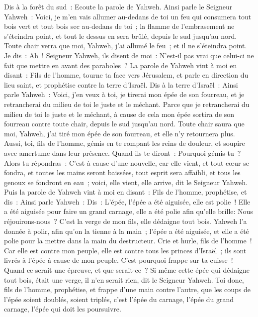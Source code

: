 \begin{multicols}{2}
Dis à la forêt du sud~: Ecoute la parole de Yahweh. Ainsi parle le Seigneur Yahweh~: Voici, je m'en vais allumer au-dedans de toi un feu qui consumera tout bois vert et tout bois sec au-dedans de toi~; la flamme de l'embrasement ne s'éteindra point, et tout le dessus en sera brûlé, depuis le sud jusqu'au nord.
Toute chair verra que moi, Yahweh, j'ai allumé le feu~; et il ne s'éteindra point.
Je dis~: Ah~! Seigneur Yahweh, ils disent de moi~: N'est-il pas vrai que celui-ci ne fait que mettre en avant des paraboles~?
La parole de Yahweh vint à moi en disant~:
Fils de l'homme, tourne ta face vers Jérusalem, et parle en direction du lieu saint, et prophétise contre la terre d'Israël.
Dis à la terre d'Israël~: Ainsi parle Yahweh~: Voici, j'en veux à toi, je tirerai mon épée de son fourreau, et je retrancherai du milieu de toi le juste et le méchant.
Parce que je retrancherai du milieu de toi le juste et le méchant, à cause de cela mon épée sortira de son fourreau contre toute chair, depuis le sud jusqu'au nord.
Toute chair saura que moi, Yahweh, j'ai tiré mon épée de son fourreau, et elle n'y retournera plus.
Aussi, toi, fils de l'homme, gémis en te rompant les reins de douleur, et soupire avec amertume dans leur présence.
Quand ils te diront~: Pourquoi gémis-tu~? Alors tu répondras~: C'est à cause d'une nouvelle, car elle vient, et tout cœur se fondra, et toutes les mains seront baissées, tout esprit sera affaibli, et tous les genoux se fondront en eau~; voici, elle vient, elle arrive, dit le Seigneur Yahweh.
Puis la parole de Yahweh vint à moi en disant~:
Fils de l'homme, prophétise, et dis~: Ainsi parle Yahweh~: Dis~: L'épée, l'épée a été aiguisée, elle est polie~!
Elle a été aiguisée pour faire un grand carnage, elle a été polie afin qu'elle brille: Nous réjouirons-nous~? C'est la verge de mon fils, elle dédaigne tout bois.
Yahweh l'a donnée à polir, afin qu'on la tienne à la main~; l'épée a été aiguisée, et elle a été polie pour la mettre dans la main du destructeur.
Crie et hurle, fils de l'homme~! Car elle est contre mon peuple, elle est contre tous les princes d'Israël~; ils sont livrés à l'épée à cause de mon peuple. C'est pourquoi frappe sur ta cuisse~!
Quand ce serait une épreuve, et que serait-ce~? Si même cette épée qui dédaigne tout bois, était une verge, il n'en serait rien, dit le Seigneur Yahweh.
Toi donc, fils de l'homme, prophétise, et frappe d'une main contre l'autre, que les coups de l'épée soient doublés, soient triplés, c'est l'épée du carnage, l'épée du grand carnage, l'épée qui doit les poursuivre.

\end{multicols}

